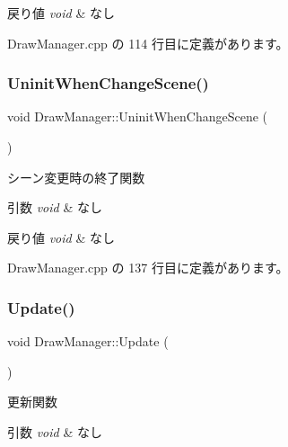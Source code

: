 \begin{DoxyRetVals}{戻り値}
{\em void} & なし \\
\hline
\end{DoxyRetVals}


 Draw\+Manager.\+cpp の 114 行目に定義があります。

\mbox{\label{class_draw_manager_a8b4ea38d625efbcc08d9b168cb5465f9}} 
\subsubsection{\texorpdfstring{Uninit\+When\+Change\+Scene()}{UninitWhenChangeScene()}}
{\footnotesize\ttfamily void Draw\+Manager\+::\+Uninit\+When\+Change\+Scene (\begin{DoxyParamCaption}{ }\end{DoxyParamCaption})}



シーン変更時の終了関数 


\begin{DoxyParams}{引数}
{\em void} & なし \\
\hline
\end{DoxyParams}

\begin{DoxyRetVals}{戻り値}
{\em void} & なし \\
\hline
\end{DoxyRetVals}


 Draw\+Manager.\+cpp の 137 行目に定義があります。

\mbox{\label{class_draw_manager_af498c44ff698bf3ef473df970e24c917}} 
\subsubsection{\texorpdfstring{Update()}{Update()}}
{\footnotesize\ttfamily void Draw\+Manager\+::\+Update (\begin{DoxyParamCaption}{ }\end{DoxyParamCaption})}



更新関数 


\begin{DoxyParams}{引数}
{\em void} & なし \\
\hline
\end{DoxyParams}

